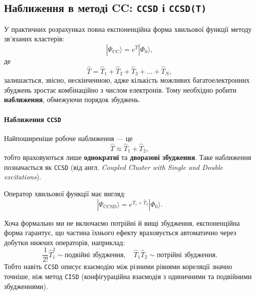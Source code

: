 %

\subsection{Наближення в методі CC: \texttt{CCSD} і \texttt{CCSD(T)}}

У практичних розрахунках повна експоненційна форма хвильової функції методу
зв'язаних кластерів:
\[
|\Psi_{\text{CC}}\rangle = e^{\hat{T}} |\Phi_0\rangle,
\]
де
\[
\hat{T} = \hat{T}_1 + \hat{T}_2 + \hat{T}_3 + \dots + \hat{T}_N,
\]
залишається, звісно, нескінченною, адже кількість можливих багатоелектронних
збуджень зростає комбінаційно з числом електронів.
Тому необхідно робити \textbf{наближення}, обмежуючи порядок збуджень.

\paragraph{Наближення \texttt{CCSD}}
Найпоширеніше робоче наближення — це
\[
\hat{T} \approx \hat{T}_1 + \hat{T}_2,
\]
тобто враховуються лише \textbf{однократні} та \textbf{дворазові збудження}.
Таке наближення позначається як \texttt{CCSD}
(від англ. \emph{Coupled Cluster with Single and Double excitations}).

Оператор хвильової функції має вигляд:
\[
|\Psi_{\text{CCSD}}\rangle = e^{\hat{T}_1 + \hat{T}_2} |\Phi_0\rangle.
\]

Хоча формально ми не включаємо потрійні й вищі збудження,
експоненційна форма гарантує, що частина їхнього ефекту враховується автоматично
через добутки нижчих операторів, наприклад:
\[
\frac{1}{2!}\hat{T}_1^2 \sim \text{подвійні збудження}, \quad
\hat{T}_1 \hat{T}_2 \sim \text{потрійні збудження}.
\]
Тобто навіть \texttt{CCSD} описує взаємодію між різними рівнями кореляції значно точніше,
ніж метод \texttt{CISD} (конфігураційна взаємодія з одиничними та подвійними збудженнями).

